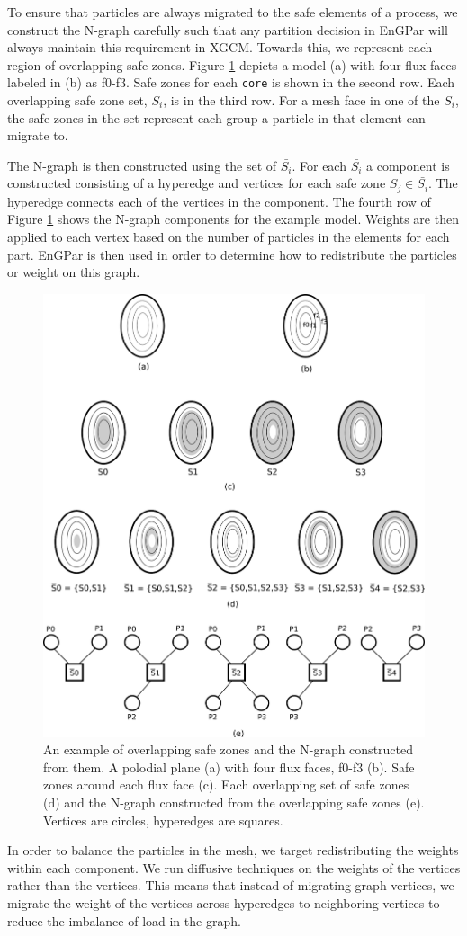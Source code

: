 \documentclass[conference]{IEEEtran}
\begin{document}
To ensure that particles are always migrated to the safe elements
of a process, we construct the N-graph carefully such that any partition
decision in EnGPar will always maintain this requirement in XGCM. Towards this,
we represent each region
of overlapping safe zones. Figure \ref{fig:sbars} depicts a model (a) with four flux faces labeled
in (b) as f0-f3. Safe zones for each \texttt{core} is shown in the second row.
Each overlapping safe zone set, $\bar{S_i}$, is in the third row. For a mesh face in
one of the $\bar{S_i}$, the safe zones in the set represent each group a particle in that element
can migrate to.

The N-graph is then constructed using the set of $\bar{S_i}$. For each $\bar{S_i}$ a
component is constructed consisting of a hyperedge and vertices for each safe zone
$S_j \in \bar{S_i}$. The hyperedge connects each of the vertices in the component.
The fourth row of Figure \ref{fig:sbars} shows the N-graph components for the example model.
Weights are then applied to each vertex based on the number of particles in the elements
for each part. 
EnGPar is then used in order to determine how to redistribute the particles or weight
on this graph.

\begin{figure}[!ht]
  \centering
  \includegraphics[width=.4\textwidth]{../figures/xgcm_ngraph_construction.png}
  \caption{An example of overlapping safe zones and the N-graph constructed from
  them. A polodial plane (a) with four flux faces, f0-f3 (b). Safe zones around each flux face (c). Each overlapping set of safe zones (d) and the N-graph constructed from the overlapping safe zones (e). Vertices are circles, hyperedges are squares.}
  \label{fig:sbars}
\end{figure}

In order to balance the particles in the mesh, we target redistributing the weights within
each component. We run diffusive techniques on the weights of the vertices
rather than the vertices. This means that instead of migrating graph vertices, we migrate the
weight of the vertices across hyperedges to neighboring vertices to reduce the imbalance
of load in the graph.
\end{document}
